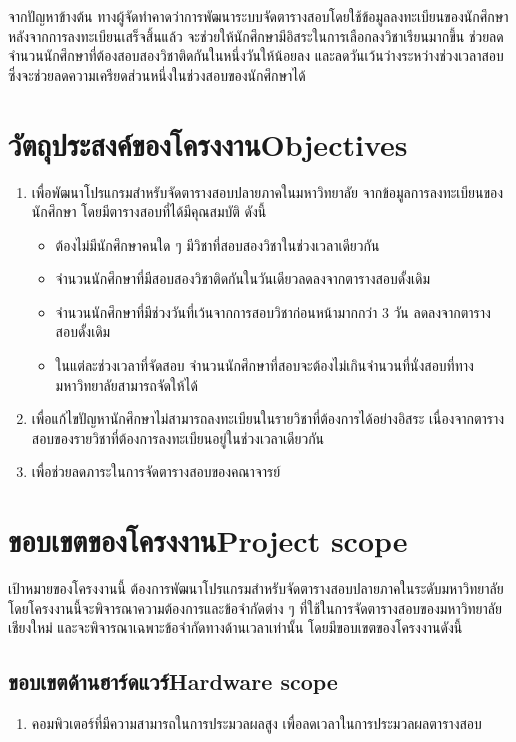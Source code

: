 จากปัญหาข้างต้น ทางผู้จัดทำคาดว่าการพัฒนาระบบจัดตารางสอบโดยใช้ข้อมูลลงทะเบียนของนักศึกษา 
หลังจากการลงทะเบียนเสร็จสิ้นแล้ว จะช่วยให้นักศึกษามีอิสระในการเลือกลงวิชาเรียนมากขึ้น 
ช่วยลดจำนวนนักศึกษาที่ต้องสอบสองวิชาติดกันในหนึ่งวันให้น้อยลง และลดวันเว้นว่างระหว่างช่วงเวลาสอบ 
ซึ่งจะช่วยลดความเครียดส่วนหนึ่งในช่วงสอบของนักศึกษาได้

\newpage
\section{\ifcpe วัตถุประสงค์ของโครงงาน\else Objectives\fi}
\label{sec:Objectives}
\begin{enumerate}
    \item เพื่อพัฒนาโปรแกรมสำหรับจัดตารางสอบปลายภาคในมหาวิทยาลัย จากข้อมูลการลงทะเบียนของนักศึกษา โดยมีตารางสอบที่ได้มีคุณสมบัติ ดังนี้
    \begin{itemize}
        \item ต้องไม่มีนักศึกษาคนใด ๆ มีวิชาที่สอบสองวิชาในช่วงเวลาเดียวกัน
        \item จำนวนนักศึกษาที่มีสอบสองวิชาติดกันในวันเดียวลดลงจากตารางสอบดั้งเดิม
        \item จำนวนนักศึกษาที่มีช่วงวันที่เว้นจากการสอบวิชาก่อนหน้ามากกว่า 3 วัน ลดลงจากตารางสอบดั้งเดิม
        \item ในแต่ละช่วงเวลาที่จัดสอบ จำนวนนักศึกษาที่สอบจะต้องไม่เกินจำนวนที่นั่งสอบที่ทางมหาวิทยาลัยสามารถจัดให้ได้
    \end{itemize}
    \item เพื่อแก้ไขปัญหานักศึกษาไม่สามารถลงทะเบียนในรายวิชาที่ต้องการได้อย่างอิสระ เนื่องจากตารางสอบของรายวิชาที่ต้องการลงทะเบียนอยู่ในช่วงเวลาเดียวกัน
    \item เพื่อช่วยลดภาระในการจัดตารางสอบของคณาจารย์
\end{enumerate}

\section{\ifcpe ขอบเขตของโครงงาน\else Project scope\fi}
เป้าหมายของโครงงานนี้ ต้องการพัฒนาโปรแกรมสำหรับจัดตารางสอบปลายภาคในระดับมหาวิทยาลัย
โดยโครงงานนี้จะพิจารณาความต้องการและข้อจำกัดต่าง ๆ ที่ใช้ในการจัดตารางสอบของมหาวิทยาลัยเชียงใหม่
และจะพิจารณาเฉพาะข้อจำกัดทางด้านเวลาเท่านั้น โดยมีขอบเขตของโครงงานดังนี้ 
\subsection{\ifcpe ขอบเขตด้านฮาร์ดแวร์\else Hardware scope\fi}
\begin{enumerate}
    \item คอมพิวเตอร์ที่มีความสามารถในการประมวลผลสูง เพื่อลดเวลาในการประมวลผลตารางสอบ
\end{enumerate}
